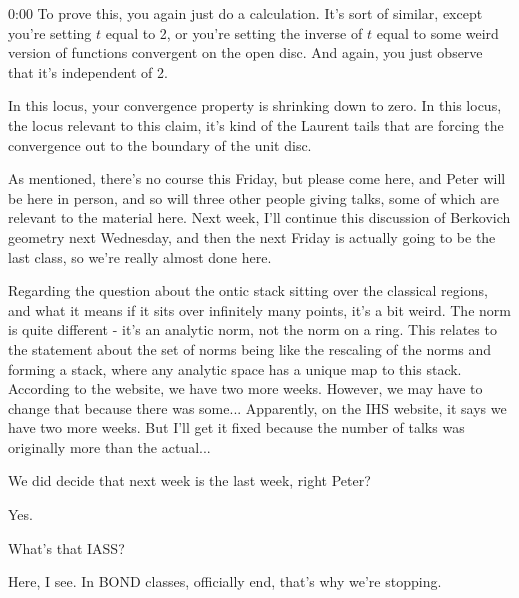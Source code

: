 \begin{unfinished}{0:00}
To prove this, you again just do a calculation. It's sort of similar, except you're setting $t$ equal to 2, or you're setting the inverse of $t$ equal to some weird version of functions convergent on the open disc. And again, you just observe that it's independent of 2.

In this locus, your convergence property is shrinking down to zero. In this locus, the locus relevant to this claim, it's kind of the Laurent tails that are forcing the convergence out to the boundary of the unit disc.

As mentioned, there's no course this Friday, but please come here, and Peter will be here in person, and so will three other people giving talks, some of which are relevant to the material here. Next week, I'll continue this discussion of Berkovich geometry next Wednesday, and then the next Friday is actually going to be the last class, so we're really almost done here.

Regarding the question about the ontic stack sitting over the classical regions, and what it means if it sits over infinitely many points, it's a bit weird. The norm is quite different - it's an analytic norm, not the norm on a ring. This relates to the statement about the set of norms being like the rescaling of the norms and forming a stack, where any analytic space has a unique map to this stack.
According to the website, we have two more weeks. However, we may have to change that because there was some... Apparently, on the IHS website, it says we have two more weeks. But I'll get it fixed because the number of talks was originally more than the actual...

We did decide that next week is the last week, right Peter?

Yes.

What's that IASS?

Here, I see. In BOND classes, officially end, that's why we're stopping.

\end{unfinished}